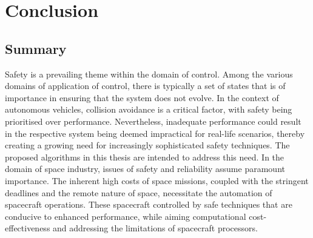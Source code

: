 
%

\chapter{Conclusion}
\label{cha:conclusion}

\section{Summary}
\label{sec:summary}

Safety is a prevailing theme within the domain of control. Among the various domains of application of control, there is typically a set of states that is of importance in ensuring that the system does not evolve. In the context of autonomous vehicles, collision avoidance is a critical factor, with safety being prioritised over performance. Nevertheless, inadequate performance could result in the respective system being deemed impractical for real-life scenarios, thereby creating a growing need for increasingly sophisticated safety techniques. The proposed algorithms in this thesis are intended to address this need. In the domain of space industry, issues of safety and reliability assume paramount importance. The inherent high costs of space missions, coupled with the stringent deadlines and the remote nature of space, necessitate the automation of spacecraft operations. These spacecraft controlled by safe techniques that are conducive to enhanced performance, while aiming computational cost-effectiveness and addressing the limitations of spacecraft processors.

